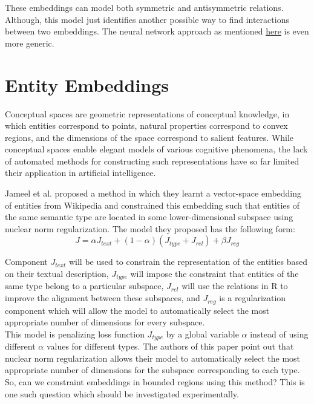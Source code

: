 \documentclass[12pt]{article}
\begin{document}
These embeddings can model both symmetric and antisymmetric relations. Although, this model just identifies  another possible way to find interactions between two embeddings. The neural network approach as mentioned \hyperref[neural]{here} is even more generic.

\section{Entity Embeddings}
\label{entity}
Conceptual spaces are geometric representations of conceptual knowledge, in which entities correspond
to points, natural properties correspond to
convex regions, and the dimensions of the space
correspond to salient features. While conceptual
spaces enable elegant models of various cognitive
phenomena, the lack of automated methods for
constructing such representations have so far limited
their application in artificial intelligence.\newline

Jameel et al.\cite{DBLP:conf/coling/JameelS16} proposed a method in which they learnt a vector-space embedding of entities from Wikipedia and constrained this embedding such that entities of the same semantic type are located in
some lower-dimensional subspace using nuclear norm\cite{2007arXiv0706.4138R} regularization.
The model they proposed has the following form:
$$ J = \alpha J_{text} + (1 − \alpha)(J_{type} + J_{rel}) + \beta J_{reg}$$

Component $J_{text}$ will be used to constrain the representation
of the entities based on their textual description,
$J_{type}$ will impose the constraint that entities of the same type
belong to a particular subspace, $J_{rel}$ will use the relations in R to improve the alignment between these subspaces, and $J_{reg}$ is a regularization component which will allow the model to automatically select the most appropriate number of dimensions for every subspace.\\

This model is penalizing loss function $J_{type}$ by a global variable $\alpha$ instead of using different $\alpha$ values for different types.
The authors of this paper\cite{} point out that nuclear
norm regularization allows their model to automatically
select the most appropriate number of dimensions for the subspace
corresponding to each type. So, can we constraint embeddings in bounded regions using this method?  This is one such question which should be investigated experimentally.\\
\end{document}
